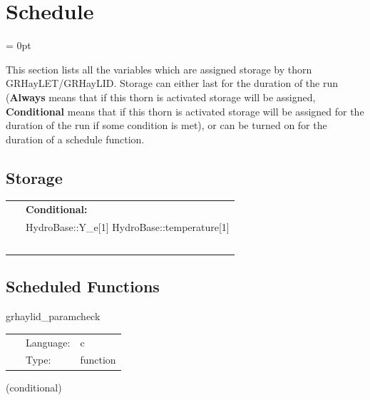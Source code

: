 
\section{Schedule} 


\parskip = 0pt


\noindent This section lists all the variables which are assigned storage by thorn GRHayLET/GRHayLID.  Storage can either last for the duration of the run ({\bf Always} means that if this thorn is activated storage will be assigned, {\bf Conditional} means that if this thorn is activated storage will be assigned for the duration of the run if some condition is met), or can be turned on for the duration of a schedule function.


\subsection*{Storage}

\hspace{5mm}

 \begin{tabular*}{160mm}{ll} 
~& {\bf Conditional:} \\ 
~ &  HydroBase::Y\_e[1] HydroBase::temperature[1]\\ 
~ & ~\\ 
\end{tabular*} 


\subsection*{Scheduled Functions}
\vspace{5mm}


\hspace{5mm} grhaylid\_paramcheck 

\hspace{5mm}{\it validate grhaylid producer, selector, eos, and representation contracts } 


\hspace{5mm}

 \begin{tabular*}{160mm}{cll} 
~ & Language:  & c \\ 
~ & Type:  & function \\ 
\end{tabular*} 


\vspace{5mm}

   (conditional) 

